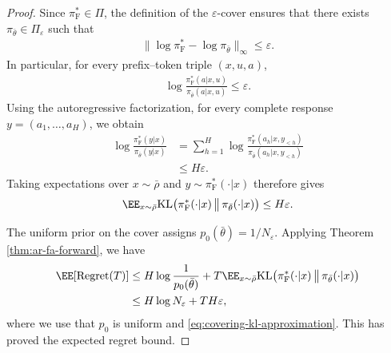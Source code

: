 \documentclass[11pt]{article}
\newcommand{\KL}{\text{KL}}
\newcommand{\pif}{\pi_{\mathrm{F}}}
\begin{document}
\begin{proof}
Since $\pif^*\in\Pi$, the definition of the $\varepsilon$-cover
ensures that there exists $\pi_{\bar\theta}\in\Pi_\varepsilon$
such that
\begin{align}
    \|\log\pif^*-\log\pi_{\bar\theta}\|_\infty
    \leq\varepsilon.
    \label{eq:covering-target-approximation}
\end{align}
In particular, for every prefix--token triple $(x,u,a)$,
\begin{align*}
    \log\frac{\pif^*(a|x,u)}
             {\pi_{\bar\theta}(a|x,u)}
    \leq\varepsilon.
\end{align*}
Using the autoregressive factorization, for every complete
response $y=(a_1,\ldots,a_H)$, we obtain
\begin{align*}
    \log\frac{\pif^*(y|x)}{\pi_{\bar\theta}(y|x)}
    &=
    \sum_{h=1}^H
    \log\frac{\pif^*(a_h|x,y_{<h})}
             {\pi_{\bar\theta}(a_h|x,y_{<h})}\\
    &\leq H\varepsilon.
\end{align*}
Taking expectations over $x\sim\bar\rho$ and
$y\sim\pif^*(\cdot|x)$ therefore gives
\begin{align}
    \EE_{x\sim\bar\rho}
    \KL\big(
        \pif^*(\cdot|x)
        \,\big\|\,
        \pi_{\bar\theta}(\cdot|x)
    \big)
    \leq H\varepsilon.
    \label{eq:covering-kl-approximation}
\end{align}

The uniform prior on the cover assigns
$p_0(\bar\theta)=1/N_\varepsilon$.
Applying Theorem \ref{thm:ar-fa-forward}, we have
\begin{align*}
    \EE[\operatorname{Regret}(T)]
    &\leq
    H\log\frac1{p_0(\bar\theta)}
    +
    T\EE_{x\sim\bar\rho}
    \KL\big(
        \pif^*(\cdot|x)
        \,\big\|\,
        \pi_{\bar\theta}(\cdot|x)
    \big)\\
    &\leq
    H\log N_\varepsilon+TH\varepsilon,
\end{align*}
where we use that $p_0$ is uniform and \eqref{eq:covering-kl-approximation}. This has proved the expected regret bound. 


\end{proof}
\end{document}

